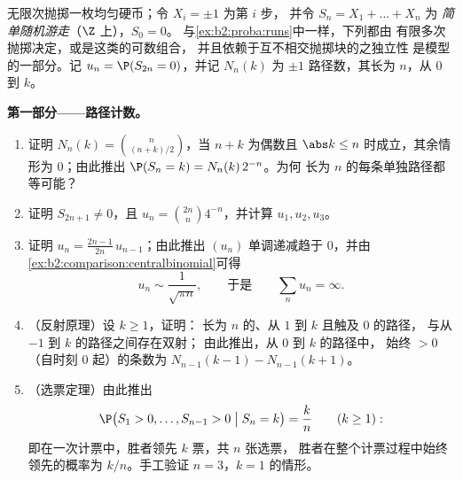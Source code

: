 \begin{problem}\label{pb:b2:proba:1}
无限次抛掷一枚均匀硬币；令 $X_i = \pm1$ 为第 $i$ 步，
并令 $S_n = X_1 + \dots + X_n$ 为
\emph{简单随机游走}（$\Z$ 上），$S_0 = 0$。
与\cref{ex:b2:proba:runs}中一样，下列都由
有限多次抛掷决定，或是这类的可数组合，
并且依赖于互不相交抛掷块的之独立性
是模型的一部分。记 $u_n =
\P(S_{2n} = 0)$，并记 $N_n(k)$ 为
$\pm1$ 路径数，其长为 $n$，从 $0$ 到 $k$。

\medskip
\noindent\textbf{第一部分——路径计数。}
\begin{enumerate}
  \item 证明 $N_n(k) = \binom{n}{(n+k)/2}$，当 $n + k$
        为偶数且 $\abs k \leq n$ 时成立，其余情形为 $0$；由此推出
        $\P(S_n = k) = N_n(k)\,2^{-n}$。为何
        长为 $n$ 的每条单独路径都等可能？
  \item 证明 $S_{2n+1} \neq 0$，且 $u_n =
        \binom{2n}{n}4^{-n}$，并计算 $u_1, u_2, u_3$。
  \item 证明 $u_n = \frac{2n-1}{2n}\,u_{n-1}$；由此推出
        $(u_n)$ 单调递减趋于 $0$，并由
        \cref{ex:b2:comparison:centralbinomial}可得
        \[
        u_n \sim \frac{1}{\sqrt{\pi n}},
        \qquad\text{于是}\qquad
        \sum_n u_n = \infty .
        \]
  \item （反射原理）设 $k \geq 1$，证明：
        长为 $n$ 的、从 $1$ 到 $k$ 且触及 $0$ 的路径，
        与从 $-1$ 到 $k$ 的路径之间存在双射；
        由此推出，从 $0$ 到 $k$ 的路径中，
        始终 $> 0$（自时刻 $0$ 起）的条数为 $N_{n-1}(k-1) -
        N_{n-1}(k+1)$。
  \item （选票定理）由此推出
        \[
        \P\bigl(S_1 > 0, \dots, S_{n-1} > 0 \bigm| S_n =
        k\bigr) = \frac kn \qquad (k \geq 1) :
        \]
        即在一次计票中，胜者领先 $k$ 票，共 $n$ 张选票，
        胜者在整个计票过程中始终领先的概率为
        $k/n$。手工验证 $n = 3$，$k =
        1$ 的情形。
\end{enumerate}


\end{problem}
